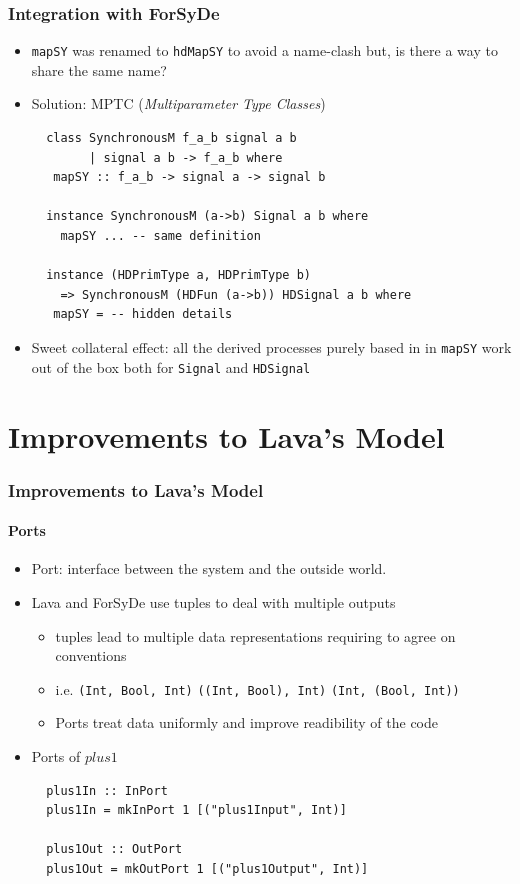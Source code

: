 \documentclass{beamer}
\begin{document}
\begin{frame}[fragile]
  \frametitle{Integration with ForSyDe}
  \begin{itemize}
  \item \texttt{mapSY} was renamed to \texttt{hdMapSY} to avoid a
    name-clash but, is there a way to share the same name?
  \pause
  \item Solution: MPTC (\textit{Multiparameter Type Classes})
    \begin{lstlisting}
  class SynchronousM f_a_b signal a b 
        | signal a b -> f_a_b where
   mapSY :: f_a_b -> signal a -> signal b

  instance SynchronousM (a->b) Signal a b where
    mapSY ... -- same definition

  instance (HDPrimType a, HDPrimType b)
    => SynchronousM (HDFun (a->b)) HDSignal a b where
   mapSY = -- hidden details
\end{lstlisting}
\pause
\item Sweet collateral effect: all the derived processes purely based
  in in \texttt{mapSY} work out of the box both for \texttt{Signal} and
  \texttt{HDSignal}
\end{itemize}  
\end{frame}

\section{Improvements to Lava's Model}

\begin{frame}[fragile]
  \frametitle{Improvements to Lava's Model}
  \framesubtitle{Ports}
  \begin{itemize}
  \item Port: interface between the system and the outside world.
  \item Lava and ForSyDe use tuples to deal with multiple outputs
    \begin{itemize}  
    \item tuples lead to multiple data representations requiring
      to agree on conventions
    \item i.e. {\scriptsize \texttt{(Int, Bool, Int)} \texttt{((Int,
          Bool), Int)} \texttt{(Int, (Bool, Int))}}
    \item Ports treat data uniformly and improve readibility of the code 
    \end{itemize}
  \pause
  \item Ports of $\mathit{plus1}$
\begin{lstlisting}
  plus1In :: InPort
  plus1In = mkInPort 1 [("plus1Input", Int)]

  plus1Out :: OutPort
  plus1Out = mkOutPort 1 [("plus1Output", Int)]
\end{lstlisting}
  \end{itemize}  
\end{frame}
\end{document}
